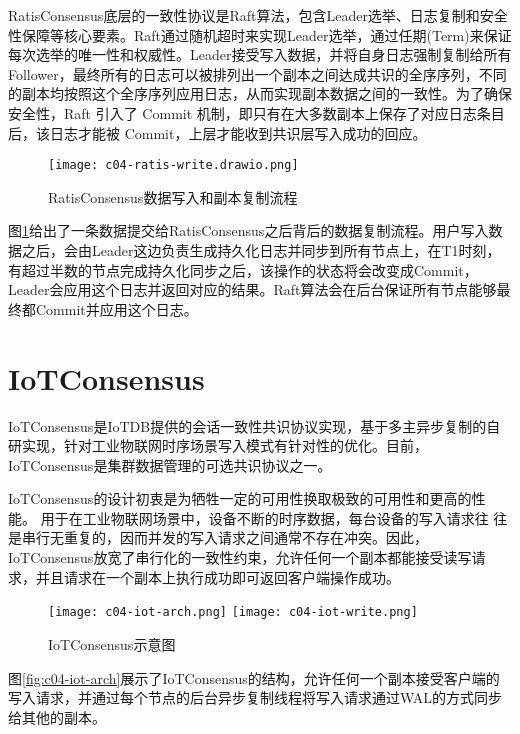 RatisConsensus底层的一致性协议是Raft算法，包含Leader选举、日志复制和安全性保障等核心要素。Raft通过随机超时来实现Leader选举，通过任期(Term)来保证每次选举的唯一性和权威性。Leader接受写入数据，并将自身日志强制复制给所有Follower，最终所有的日志可以被排列出一个副本之间达成共识的全序序列，不同的副本均按照这个全序序列应用日志，从而实现副本数据之间的一致性。为了确保安全性，Raft 引入了 Commit 机制，即只有在大多数副本上保存了对应日志条目后，该日志才能被 Commit，上层才能收到共识层写入成功的回应。

\begin{figure}
  \centering
  \texttt{[image: c04-ratis-write.drawio.png]}
  \caption{RatisConsensus数据写入和副本复制流程}
  \label{fig:c04-ratis-write}
\end{figure}

图\ref{fig:c04-ratis-write}给出了一条数据提交给RatisConsensus之后背后的数据复制流程。用户写入数据之后，会由Leader这边负责生成持久化日志并同步到所有节点上，在T1时刻，有超过半数的节点完成持久化同步之后，该操作的状态将会改变成Commit，Leader会应用这个日志并返回对应的结果。Raft算法会在后台保证所有节点能够最终都Commit并应用这个日志。



\section{IoTConsensus}

IoTConsensus是IoTDB提供的会话一致性共识协议实现，基于多主异步复制的自研实现，针对工业物联网时序场景写入模式有针对性的优化。目前，IoTConsensus是集群数据管理的可选共识协议之一。

IoTConsensus的设计初衷是为牺牲一定的可用性换取极致的可用性和更高的性能。
用于在工业物联网场景中，设备不断的时序数据，每台设备的写入请求往
往是串行无重复的，因而并发的写入请求之间通常不存在冲突。因此，IoTConsensus放宽了串行化的一致性约束，允许任何一个副本都能接受读写请求，并且请求在一个副本上执行成功即可返回客户端操作成功。


\begin{figure}
  \centering
    {\texttt{[image: c04-iot-arch.png]}}
    {\texttt{[image: c04-iot-write.png]}}
  \caption{IoTConsensus示意图}
  \label{fig:c04-iot-consensus}
\end{figure}

图\ref{fig:c04-iot-arch}展示了IoTConsensus的结构，允许任何一个副本接受客户端的写入请求，并通过每个节点的后台异步复制线程将写入请求通过WAL的方式同步给其他的副本。


